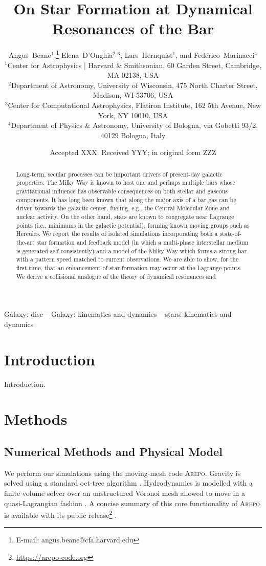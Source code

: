 \documentclass[a4paper,fleqn,usenatbib]{mnras}
\title[Star Bar]{On Star Formation at Dynamical Resonances of the Bar}
\author[A. Beane et al.]{
Angus~Beane$^{1}$,\thanks{E-mail: angus.beane@cfa.harvard.edu}
Elena~D'Onghia$^{2,3}$,
Lars~Hernquist$^{1}$,
and Federico~Marinacci$^{4}$
\\
$^{1}$Center for Astrophysics {\normalfont |} Harvard \& Smithsonian, 60 Garden Street, Cambridge, MA 02138, USA\\
$^{2}$Department of Astronomy, University of Wisconsin, 475 North Charter Street, Madison, WI 53706, USA\\
$^{3}$Center for Computational Astrophysics, Flatiron Institute, 162 5th Avenue, New York, NY 10010, USA\\
$^{4}$Department of Physics \& Astronomy, University of Bologna, via Gobetti 93/2, 40129 Bologna, Italy
}
\date{Accepted XXX. Received YYY; in original form ZZZ}
\newcommand{\arepo}{\textsc{Arepo}}
\begin{document}
\label{firstpage}
\pagerange{\pageref{firstpage}--\pageref{lastpage}}
\maketitle

\begin{abstract}
Long-term, secular processes can be important drivers of present-day galactic
properties. The Milky Way is known to host one and perhaps multiple bars whose
gravitational influence has observable consequences on both stellar and
gaseous components. It has long been known that along the major axis of a bar
gas can be driven towards the galactic center, fueling, e.g., the Central
Molecular Zone and nuclear activity. On the other hand, stars are known to
congregate near Lagrange points (i.e., minimums in the galactic potential),
forming known moving groups such as Hercules. We report the results of
isolated simulations incorporating both a state-of-the-art star formation and
feedback model (in which a multi-phase interstellar medium is generated
self-consistently) and a model of the Milky Way which forms a strong bar with
a pattern speed matched to current observations. We are able to show, for the
first time, that an enhancement of star formation may occur at the Lagrange
points. We derive a collisional analogue of the theory of dynamical resonances
and
\end{abstract}

\begin{keywords}
Galaxy: disc -- Galaxy: kinematics and dynamics -- stars: kinematics and dynamics
\end{keywords}



\section{Introduction}
Introduction.

\section{Methods}
\subsection{Numerical Methods and Physical Model}
We perform our simulations using the moving-mesh code \arepo{}. Gravity is
solved using a standard oct-tree algorithm \citep{1986Natur.324..446B}.
Hydrodynamics is modelled with a finite volume solver over an unstructured
Voronoi mesh allowed to move in a quasi-Lagrangian fashion
\citep{2010MNRAS.401..791S, 2016MNRAS.455.1134P}. A concise summary of this
core functionality of \arepo{} is available with its public
release\footnote{\url{https://arepo-code.org}} \citep{2019arXiv190904667W}.
\end{document}
